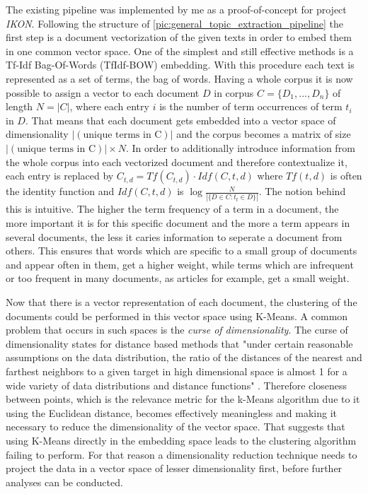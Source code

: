 The existing pipeline was implemented by me as a proof-of-concept for project \textit{IKON}. Following the structure of \autoref{pic:general_topic_extraction_pipeline} the first step is a document vectorization of the given texts in order to embed them in one common vector space. One of the simplest and still effective methods is a Tf-Idf Bag-Of-Words (TfIdf-BOW) embedding. With this procedure each text is represented as a set of terms, the bag of words. Having a whole corpus it is now possible to assign a vector to each document $D$ in corpus $C=\{D_1, ..., D_n\}$ of length $N = |C|$, where each entry $i$ is the number of term occurrences of term $t_i$ in $D$. That means that each document gets embedded into a vector space of dimensionality $|(\text{unique terms in C})|$ and the corpus becomes a matrix of size $|(\text{unique terms in C})| \times N$. In order to additionally introduce information from the whole corpus into each vectorized document and therefore contextualize it, each entry is replaced by $C_{t,d}=Tf(C_{t,d}) \cdot Idf(C,t,d)$ where $Tf(t,d)$ is often the identity function and $Idf(C,t,d)$ is $\log\frac{N}{|\{ D \in C : t_t \in D \}|}$. \cite{PivotedDocumentLength} The notion behind this is intuitive. The higher the term frequency of a term in a document, the more important it is for this specific document and the more a term appears in several documents, the less it caries information to seperate a document from others.  This ensures that words which are specific to a small group of documents and appear often in them, get a higher weight, while terms which are infrequent or too frequent in many documents, as articles for example, get a small weight.

Now that there is a vector representation of each document, the clustering of the documents could be performed in this vector space using K-Means. A common problem that occurs in such spaces is the \textit{curse of dimensionality}. The curse of dimensionality states for distance based methods that "under certain reasonable assumptions on the data distribution, the ratio of the distances of the nearest and farthest neighbors to a given target in high dimensional space is almost 1 for a wide variety of data distributions and distance functions" \cite{aggarwalSurprisingBehaviorDistance2001}. Therefore closeness between points, which is the relevance metric for the k-Means algorithm due to it using the Euclidean distance, becomes effectively meaningless and making it necessary to reduce the dimensionality of the vector space. That suggests that using K-Means directly in the embedding space leads to the clustering algorithm failing to perform. For that reason a dimensionality reduction technique needs to project the data in a vector space of lesser dimensionality first, before further analyses can be conducted.

